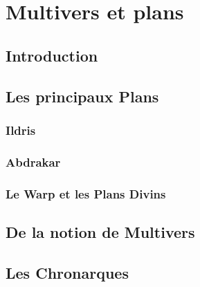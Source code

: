 \chapter{Multivers et plans}
\section{Introduction}
\section{Les principaux Plans}
\subsection{Ildris}
\subsection{Abdrakar}
\subsection{Le Warp et les Plans Divins}
\section{De la notion de Multivers}
\section{Les Chronarques}
\label{Chronarques}